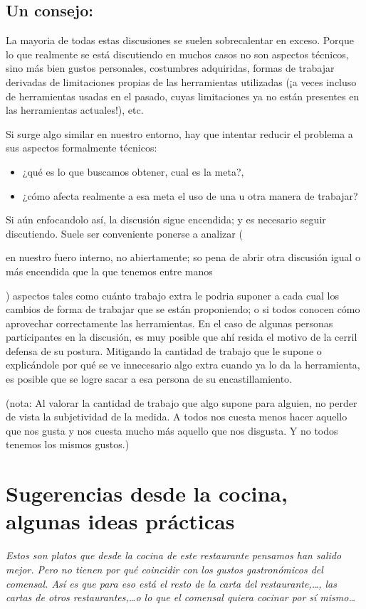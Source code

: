 \documentclass[spanish,12pt,a4paper,final,oneside]{book}
\begin{document}
\section{Un consejo:}
La mayoria de todas estas discusiones se suelen sobrecalentar en exceso. Porque lo que realmente se está discutiendo en muchos casos no son aspectos técnicos, sino más bien gustos personales, costumbres adquiridas, formas de trabajar derivadas de limitaciones propias de las herramientas utilizadas (¡a veces incluso de herramientas usadas en el pasado, cuyas limitaciones ya no están presentes en las herramientas actuales!), etc.

Si surge algo similar en nuestro entorno, hay que intentar reducir el problema a sus aspectos formalmente técnicos:
\begin{itemize}
\item ¿qué es lo que buscamos obtener, cual es la meta?, 
\item ¿cómo afecta realmente a esa meta el uso de una u otra manera de trabajar?
\end{itemize}

Si aún enfocandolo así, la discusión sigue encendida; y es necesario seguir discutiendo. Suele ser conveniente ponerse a analizar (\begin{footnotesize}en nuestro fuero interno, no abiertamente; so pena de abrir otra discusión igual o más encendida que la que tenemos entre manos\end{footnotesize}) aspectos tales como cuánto trabajo extra le podria suponer a cada cual los cambios de forma de trabajar que se están proponiendo; o si todos conocen cómo aprovechar correctamente las herramientas. En el caso de algunas personas participantes en la discusión, es muy posible que ahí resida el motivo de la cerril defensa de su postura. Mitigando la cantidad de trabajo que le supone o explicándole por qué se ve innecesario algo extra cuando ya lo da la herramienta, es posible que se logre sacar a esa persona de su encastillamiento.

(nota: Al valorar la cantidad de trabajo que algo supone para alguien, no perder de vista la subjetividad de la medida. A todos nos cuesta menos hacer aquello que nos gusta y nos cuesta mucho más aquello que nos disgusta. Y no todos tenemos los mismos gustos.)


\chapter{Sugerencias desde la cocina, algunas ideas prácticas}
\textit{Estos son platos que desde la cocina de este restaurante pensamos han salido mejor. Pero no tienen por qué coincidir con los gustos gastronómicos del comensal. Así es que para eso está el resto de la carta del restaurante,\ldots, las cartas de otros restaurantes,\ldots o lo que el comensal quiera cocinar por sí mismo\ldots}
\end{document}
